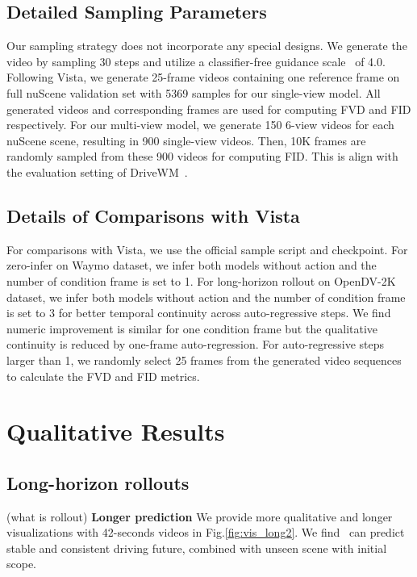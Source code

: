 \subsection{Detailed Sampling Parameters}
\label{sec:supp_sample_details}
Our sampling strategy does not incorporate any special designs. We generate the video by sampling 30 steps and utilize a classifier-free guidance scale~\cite{ho2022classifier} of 4.0.
Following Vista, we generate 25-frame videos containing one reference frame on full nuScene validation set with 5369 samples for our single-view model. All generated videos and corresponding frames are used for computing FVD and FID respectively. For our multi-view model, we generate 150 6-view videos for each nuScene scene, resulting in 900 single-view videos. Then,  10K frames are randomly sampled from these 900 videos for computing FID. This is align with the evaluation setting of DriveWM~\cite{drive-wm}.

\subsection{Details of Comparisons with Vista}
For comparisons with Vista, we use the official sample script and checkpoint. For zero-infer on Waymo dataset, we infer both models without action and the number of condition frame is set to 1. For long-horizon rollout on OpenDV-2K dataset, we infer both models without action and the number of condition frame is set to 3 for better temporal continuity across auto-regressive steps. We find numeric improvement is similar for one condition frame but the qualitative continuity is reduced by one-frame auto-regression. For auto-regressive steps larger than 1, we randomly select 25 frames from the generated video sequences to calculate the FVD and FID metrics.

\section{Qualitative Results}
\label{sec:rationale}
\subsection{Long-horizon rollouts}(what is rollout)
\noindent\textbf{Longer prediction} We provide more qualitative and longer visualizations with 42-seconds videos in Fig.\ref{fig:vis_long2}. We find \ourmethod\ can predict stable and consistent driving future, combined with unseen scene with initial scope.

